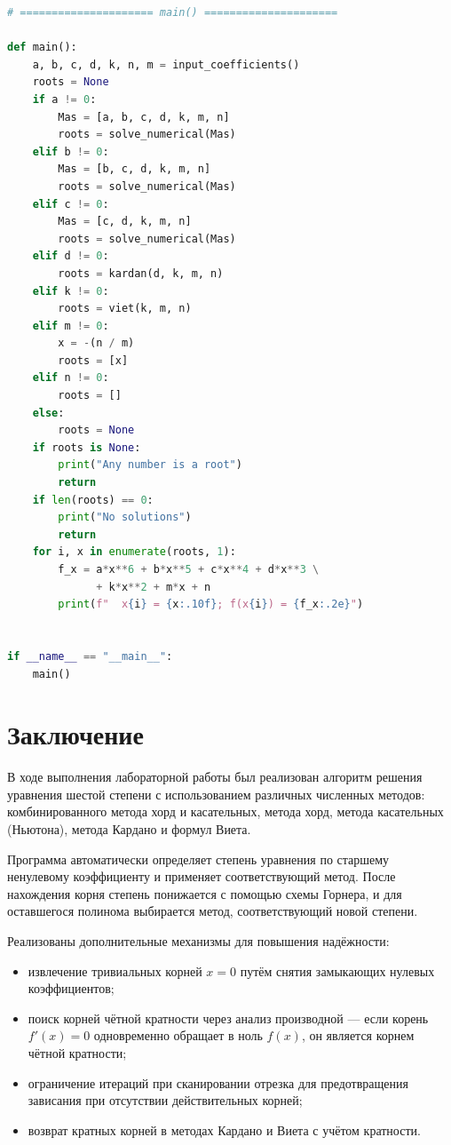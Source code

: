 \documentclass[a4paper,14pt]{extarticle}
\begin{document}
\begin{lstlisting}[language=Python]
# ===================== main() =====================

def main():
    a, b, c, d, k, n, m = input_coefficients()
    roots = None
    if a != 0:
        Mas = [a, b, c, d, k, m, n]
        roots = solve_numerical(Mas)
    elif b != 0:
        Mas = [b, c, d, k, m, n]
        roots = solve_numerical(Mas)
    elif c != 0:
        Mas = [c, d, k, m, n]
        roots = solve_numerical(Mas)
    elif d != 0:
        roots = kardan(d, k, m, n)
    elif k != 0:
        roots = viet(k, m, n)
    elif m != 0:
        x = -(n / m)
        roots = [x]
    elif n != 0:
        roots = []
    else:
        roots = None
    if roots is None:
        print("Any number is a root")
        return
    if len(roots) == 0:
        print("No solutions")
        return
    for i, x in enumerate(roots, 1):
        f_x = a*x**6 + b*x**5 + c*x**4 + d*x**3 \
              + k*x**2 + m*x + n
        print(f"  x{i} = {x:.10f}; f(x{i}) = {f_x:.2e}")


if __name__ == "__main__":
    main()
\end{lstlisting}

\newpage
\section*{Заключение}
\label{sec:conclusion}

В ходе выполнения лабораторной работы был реализован алгоритм решения уравнения шестой степени с использованием различных численных методов: комбинированного метода хорд и касательных, метода хорд, метода касательных (Ньютона), метода Кардано и формул Виета.

Программа автоматически определяет степень уравнения по старшему ненулевому коэффициенту и применяет соответствующий метод. После нахождения корня степень понижается с помощью схемы Горнера, и для оставшегося полинома выбирается метод, соответствующий новой степени.

Реализованы дополнительные механизмы для повышения надёжности:
\begin{itemize}
  \item извлечение тривиальных корней $x = 0$ путём снятия замыкающих нулевых коэффициентов;
  \item поиск корней чётной кратности через анализ производной --- если корень $f'(x) = 0$ одновременно обращает в ноль $f(x)$, он является корнем чётной кратности;
  \item ограничение итераций при сканировании отрезка для предотвращения зависания при отсутствии действительных корней;
  \item возврат кратных корней в методах Кардано и Виета с учётом кратности.
\end{itemize}
\end{document}

